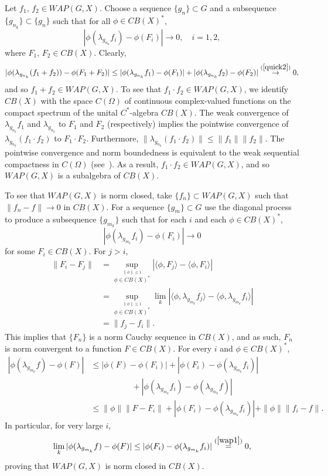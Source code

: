Let $f_1$, $f_2 \in WAP(G,X)$.  Choose a sequence $\{g_n\} \subset G$ and a subsequence $\{g_{n_k}\}\subset \{g_n\}$
such that for all $\phi\in CB(X)^*$,
\begin{equation}\label{quick2}
| \phi(\lambda_{g_{n_k}}f_i) -\phi(F_i)|\rightarrow 0,\quad i=1,2,
\end{equation}
where $F_1$, $F_2 \in CB(X)$.  Clearly,
\[
|\phi(\lambda_{g_{n_k}}(f_1 + f_2)) - \phi(F_1 + F_2)| \leq |\phi(\lambda_{g_{n_k}}f_1) - \phi(F_1)|
+ |\phi(\lambda_{g_{n_k}}f_2) - \phi(F_2)| \stackrel{(\ref{quick2})}{\rightarrow} 0,
\]
and so $f_1+f_2 \in WAP(G,X)$.
To see that $f_1\cdot f_2 \in WAP(G,X)$, we identify $CB(X)$ with the space $C(\Omega)$ of continuous complex-valued
functions on the compact spectrum of the unital $C^*$-algebra $CB(X)$.  The weak convergence of
$\lambda_{g_{n_k}}f_1$ and $\lambda_{g_{n_k}}$ to $F_1$ and $F_2$ (respectively) implies the pointwise convergence
of $\lambda_{g_{n_k}}(f_1\cdot f_2)$ to $F_1\cdot F_2$.  Furthermore,
$\|\lambda_{g_{n_k}}(f_1\cdot f_2)\| \leq \|f_1\|\|f_2\|$.
The pointwise convergence and norm boundedness is equivalent to the weak sequential compactness
in $C(\Omega)$ (see~\cite[Theorem 1.3]{eberlein}).  As a result, $f_1\cdot f_2 \in WAP(G,X)$, and so $WAP(G,X)$
is a subalgebra of $CB(X)$.

To see that $WAP(G,X)$ is norm closed, take $\{f_n\} \subset WAP(G,X)$ such that
$\|f_n - f\| \rightarrow 0$ in $CB(X)$.  For a sequence $\{g_m\}\subset G$
use the diagonal process to produce a subsequence $\{g_{m_k}\}$ such that for each $i$
and each $\phi\in CB(X)^*$,
\begin{equation}\label{wap1}
|\phi(\lambda_{g_{m_k}}f_i) - \phi(F_i)| \rightarrow 0
\end{equation}
for some $F_i \in CB(X)$.  For $j>i$,
\begin{align*}
\|F_i - F_j\| &= \sup_{\stackrel{\scriptstyle \|\phi\|\leq 1}{\phi\in CB(X)^*}} |\langle \phi, F_j\rangle - \langle \phi, F_i\rangle |\\ &= \sup_{\stackrel{\scriptstyle \|\phi\|\leq 1}{\phi\in CB(X)^*}} \lim_k |\langle \phi, \lambda_{g_{m_k}}f_j\rangle - \langle \phi, \lambda_{g_{m_k}}f_i\rangle | \\
&= \|f_j - f_i\|.
\end{align*}
This implies that $\{F_n\}$ is a norm Cauchy sequence in $CB(X)$, and as such, $F_n$ is norm convergent to a function
$F\in CB(X)$.  For every $i$ and $\phi\in CB(X)^*$,
\begin{align*}
|\phi(\lambda_{g_{m_k}}f) - \phi(F)| &\leq |\phi(F) - \phi(F_i)| + |\phi(F_i) - \phi(\lambda_{g_{m_k}}f_i)| \\
&\qquad\qquad\quad +|\phi(\lambda_{g_{m_k}}f_i) - \phi(\lambda_{g_{m_k}}f)| \\
&\leq \|\phi\|\|F - F_i\| + |\phi(F_i) - \phi(\lambda_{g_{m_k}}f_i)| + \|\phi\|\|f_i - f\|.
\end{align*}
In particular, for very large $i$,
\[
\lim_k |\phi(\lambda_{g_{m_k}}f) - \phi(F)| \leq |\phi(F_i) - \phi(\lambda_{g_{m_k}}f_i)| \stackrel{(\ref{wap1})}{=} 0,
\]
proving that $WAP(G,X)$ is norm closed in $CB(X)$.
\done

